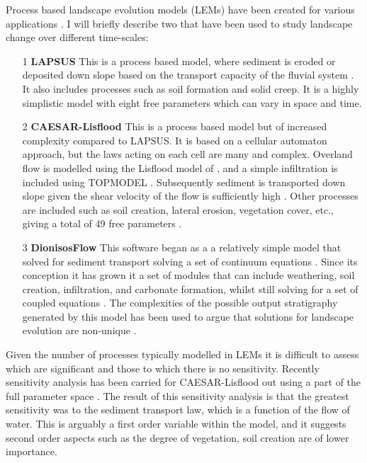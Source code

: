 Process based landscape evolution models (LEMs) have been created for various applications \citep[see for example][]{temme-etal-2017}. I will briefly describe two that have been used to study landscape change over different time-scales:
\begin{itemize}
\item[1] {\bf LAPSUS}
This is a process based model, where sediment is eroded or deposited down slope based on the transport capacity of the fluvial system \citep{schoorl-etal-2000}. It also includes processes such as soil formation and solid creep. It is a highly simplistic model with eight free parameters which can vary in space and time.
\item[2] {\bf CAESAR-Lisflood}
This is a process based model but of increased complexity compared to LAPSUS. It is based on a cellular automaton approach, but the laws acting on each cell are many and complex. Overland flow is modelled using the Lisflood model of \cite{bates-etal-2010}, and a simple infiltration is included using TOPMODEL \citep{beven-1979}. Subsequently sediment is transported down slope given the shear velocity of the flow is sufficiently high \citep{coulthard-etal-2013,vandeweil-etal-2007}. Other processes are included such as soil creation, lateral erosion, vegetation cover, etc., giving a total of 49 free parameters \citep{skinner-etal-2018}.
\item[3] {\bf DionisosFlow}
This software began as a a relatively simple model that solved for sediment transport solving a set of continuum equations \citep{granjeon-1999}. Since its conception it has grown it a set of modules that can include weathering, soil creation, infiltration, and carbonate formation, whilst still solving for a set of coupled equations \citep{peton-etal-2020}. The complexities of the possible output stratigraphy generated by this model has been used to argue that solutions for landscape evolution are non-unique \citep{burgess-2015}.
\end{itemize}
Given the number of processes typically modelled in LEMs it is difficult to assess which are significant and those to which there is no sensitivity. Recently sensitivity analysis has been carried for CAESAR-Lisflood out using a part of the full parameter space \citep{skinner-etal-2018}. The result of this sensitivity analysis is that the greatest sensitivity was to the sediment transport law, which is a function of the flow of water. This is arguably a first order variable within the model, and it suggests second order aspects such as the degree of vegetation, soil creation are of lower importance.

